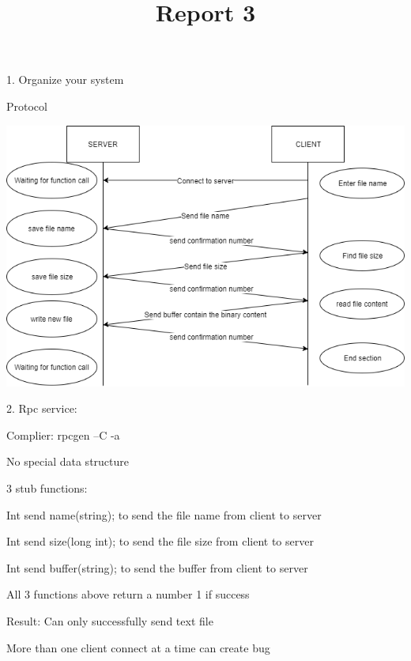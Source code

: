 \documentclass[12pt,a4paper]{article}
\title{Report 3}
\begin{document}
1. Organize your system

Protocol

\includegraphics[scale=0.7]{report2_rpc.png}

2. Rpc service:

Complier: rpcgen –C -a

No special data structure

3 stub functions:

Int send name(string); to send the file name from client to server

Int send size(long int); to send the file size from client to server

Int send buffer(string); to send the buffer from client to server

All 3 functions above return a number 1 if success

Result:
Can only successfully send text file

More than one client connect at a time can create bug
\end{document}
